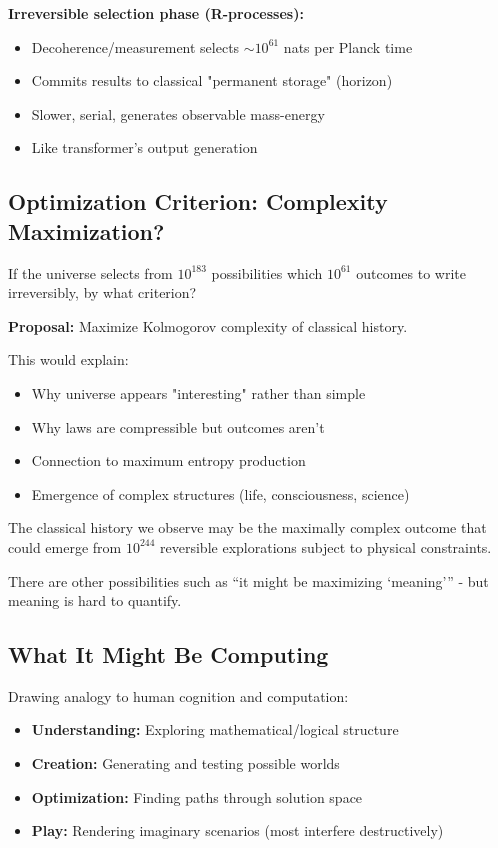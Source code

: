 ﻿\documentclass{article}
\begin{document}
\textbf{Irreversible selection phase (R-processes):}
\begin{itemize}
\item Decoherence/measurement selects $\sim 10^{61}$ nats per Planck time
\item Commits results to classical "permanent storage" (horizon)
\item Slower, serial, generates observable mass-energy
\item Like transformer's output generation
\end{itemize}


\subsection{Optimization Criterion: Complexity Maximization?}


If the universe selects from $10^{183}$ possibilities which $10^{61}$ outcomes to write irreversibly, by what criterion?


\textbf{Proposal:} Maximize Kolmogorov complexity of classical history.


This would explain:
\begin{itemize}
\item Why universe appears "interesting" rather than simple
\item Why laws are compressible but outcomes aren't
\item Connection to maximum entropy production
\item Emergence of complex structures (life, consciousness, science)
\end{itemize}


The classical history we observe may be the maximally complex outcome that could emerge from $10^{244}$ reversible explorations subject to physical constraints.

There are other possibilities such as “it might be maximizing ‘meaning’” - but meaning is hard to quantify.


\subsection{What It Might Be Computing}


Drawing analogy to human cognition and computation:
\begin{itemize}
\item \textbf{Understanding:} Exploring mathematical/logical structure
\item \textbf{Creation:} Generating and testing possible worlds
\item \textbf{Optimization:} Finding paths through solution space
\item \textbf{Play:} Rendering imaginary scenarios (most interfere destructively)
\end{itemize}
\end{document}
